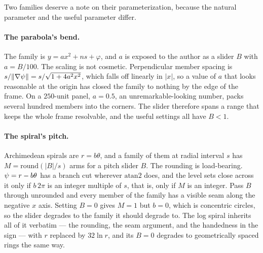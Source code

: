 Two families deserve a note on their parameterization, because the natural
parameter and the useful parameter differ.

\paragraph{The parabola's bend.} The family is $y=ax^2+ns+\varphi$, and $a$ is
exposed to the author as a slider $B$ with $a=B/100$. The scaling is not
cosmetic. Perpendicular member spacing is $s/\lVert\nabla\psi\rVert =
s/\sqrt{1+4a^2x^2}$, which falls off linearly in $\lvert x\rvert$, so a value of
$a$ that looks reasonable at the origin has closed the family to nothing by the
edge of the frame. On a $250$-unit panel, $a=0.5$, an unremarkable-looking
number, packs several hundred members into the corners. The slider therefore
spans a range that keeps the whole frame resolvable, and the useful settings all
have $B<1$.

\paragraph{The spiral's pitch.} Archimedean spirals are $r=b\theta$, and a
family of them at radial interval $s$ has $M=\mathrm{round}(\lvert B\rvert/s)$
arms for a pitch slider $B$. The rounding is load-bearing. $\psi=r-b\theta$ has a
branch cut wherever $\mathrm{atan2}$ does, and the level sets close across it only
if $b\,2\pi$ is an integer multiple of $s$, that is, only if $M$ is an integer.
Pass $B$ through unrounded and every member of the family has a visible seam along
the negative $x$ axis. Setting $B=0$ gives $M=1$ but $b=0$, which is concentric
circles, so the slider degrades to the family it should degrade to. The log
spiral inherits all of it verbatim --- the rounding, the seam argument, and the
handedness in the sign --- with $r$ replaced by $32\ln r$, and its $B=0$
degrades to geometrically spaced rings the same way.
